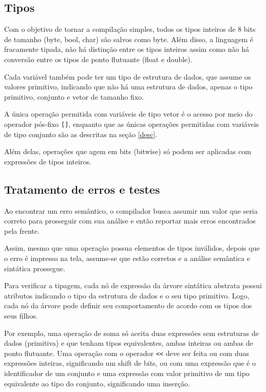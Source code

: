 \documentclass[
	article,			%
	11pt,				%
	oneside,			%
	a4paper,			%
	english,			%
	brazil,				%
	sumario=tradicional
	]{abntex2}
\begin{document}
\subsection{Tipos}

Com o objetivo de tornar a compilação simples, todos os tipos inteiros de 8 bits de tamanho (byte, bool, char) são salvos como byte. Além disso, a linguagem é fracamente tipada, não há distinção entre os tipos inteiros assim como não há conversão entre os tipos de ponto flutuante (float e double).

Cada variável também pode ter um tipo de estrutura de dados, que assume os valores primitivo, indicando que não há uma estrutura de dados, apenas o tipo primitivo, conjunto e vetor de tamanho fixo.

A única operação permitida com variáveis de tipo vetor é o acesso por meio do operador pós-fixo \texttt{[]}, enquanto que as únicas operações permitidas com variáveis de tipo conjunto são as descritas na seção \ref{desc}.

Além delas, operações que agem em bits (bitwise) só podem ser aplicadas com expressões de tipos inteiros.

\subsection{Tratamento de erros e testes}

Ao encontrar um erro semântico, o compilador busca assumir um valor que seria correto para prosseguir com sua análise e então reportar mais erros encontrados pela frente.

Assim, mesmo que uma operação possua elementos de tipos inválidos, depois que o erro é impresso na tela, assume-se que estão corretos e a análise semântica e sintática prossegue.

Para verificar a tipagem, cada nó de expressão da árvore sintática abstrata possui atributos indicando o tipo da estrutura de dados e o seu tipo primitivo. Logo, cada nó da árvore pode definir seu comportamento de acordo com os tipos dos seus filhos.

Por exemplo, uma operação de soma só aceita duas expressões sem estruturas de dados (primitiva) e que tenham tipos equivalentes, ambas inteiras ou ambas de ponto flutuante. Uma operação com o operador \texttt{<<} deve ser feita ou com duas expressões inteiras, significando um shift de bits, ou com uma expressão que é o identificador de um conjunto e uma expressão com valor primitivo de um tipo equivalente ao tipo do conjunto, significando uma inserção.
\end{document}
